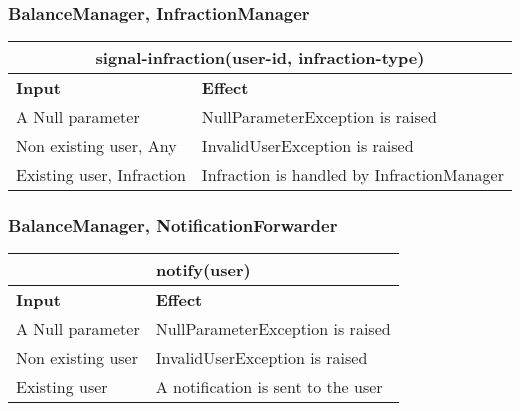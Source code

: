 \subsubsection{BalanceManager, InfractionManager}
\begin{tabular}{|p{5cm}|p{7cm}|}
\hline
\multicolumn{2}{|c|}{signal-infraction(user-id, infraction-type)} \\
\hline
\textbf{Input} & \textbf{Effect} \\

\hline
A Null parameter & NullParameterException is raised \\

\hline
Non existing user, Any & InvalidUserException is raised \\

\hline
Existing user, Infraction & Infraction is handled by InfractionManager \\
\hline
\end{tabular}

\subsubsection{BalanceManager, NotificationForwarder}
\begin{tabular}{|p{5cm}|p{7cm}|}
\hline
\multicolumn{2}{|c|}{notify(user)} \\
\hline
\textbf{Input} & \textbf{Effect} \\

\hline
A Null parameter & NullParameterException is raised \\

\hline
Non existing user & InvalidUserException is raised \\

\hline
Existing user & A notification is sent to the user \\
\hline
\end{tabular}

